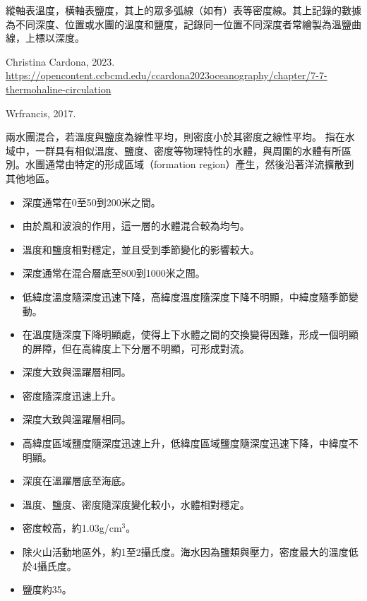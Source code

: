 \documentclass[a4paper,12pt]{report}
\begin{document}
縱軸表溫度，橫軸表鹽度，其上的眾多弧線（如有）表等密度線。其上記錄的數據為不同深度、位置或水團的溫度和鹽度，記錄同一位置不同深度者常繪製為溫鹽曲線，上標以深度。
\bct\bfH\ctr{}\caption{Christina Cardona, 2023. \href{https://opencontent.ccbcmd.edu/ccardona2023oceanography/chapter/7-7-thermohaline-circulation}{https://opencontent.ccbcmd.edu/ccardona2023oceanography/chapter/7-7-thermohaline-circulation}}\ef\FB\ect
\bct\bfH\ctr{}\caption{Wrfrancis, 2017.}\ef\FB\ect
{}
兩水團混合，若溫度與鹽度為線性平均，則密度小於其密度之線性平均。
指在水域中，一群具有相似溫度、鹽度、密度等物理特性的水體，與周圍的水體有所區別。水團通常由特定的形成區域（formation region）產生，然後沿著洋流擴散到其他地區。
\begin{itemize}
\item 深度通常在0至50到200米之間。
\item 由於風和波浪的作用，這一層的水體混合較為均勻。
\item 溫度和鹽度相對穩定，並且受到季節變化的影響較大。
\end{itemize}
\begin{itemize}
\item 深度通常在混合層底至800到1000米之間。
\item 低緯度溫度隨深度迅速下降，高緯度溫度隨深度下降不明顯，中緯度隨季節變動。
\item 在溫度隨深度下降明顯處，使得上下水體之間的交換變得困難，形成一個明顯的屏障，但在高緯度上下分層不明顯，可形成對流。
\end{itemize}
\begin{itemize}
\item 深度大致與溫躍層相同。
\item 密度隨深度迅速上升。
\end{itemize}
\begin{itemize}
\item 深度大致與溫躍層相同。
\item 高緯度區域鹽度隨深度迅速上升，低緯度區域鹽度隨深度迅速下降，中緯度不明顯。
\end{itemize}
\begin{itemize}
\item 深度在溫躍層底至海底。
\item 溫度、鹽度、密度隨深度變化較小，水體相對穩定。
\item 密度較高，約1.03g/cm$^3$。
\item 除火山活動地區外，約1至2攝氏度。海水因為鹽類與壓力，密度最大的溫度低於4攝氏度。
\item 鹽度約35\textperthousand。
\end{itemize}
\end{document}
